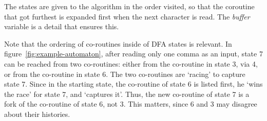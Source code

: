 \documentclass[11pt,a4paper,twoside,openright]{Thesis}
\theoremstyle{definition}
\newcommand{\Figref}[1]{figure~\ref{fig:#1}}
\begin{document}
The states are given to the algorithm in the order visited, so that the
coroutine that got furthest is expanded first when the next character is
read. The \emph{buffer} variable is a detail that ensures this.

Note that the ordering of co-routines inside of DFA states is relevant.
In \Figref{example-automaton}, after reading only one comma as an
input, state 7 can be reached from two co-routines: either from the
co-routine in state 3, via 4, or from the co-routine in state 6. The two
co-routines are `racing' to capture state 7. Since in the starting
state, the co-routine of state 6 is listed first, he `wins the race'
for state 7, and `captures it'. Thus, the new co-routine of state 7 is
a fork of the co-routine of state 6, not 3. This matters, since 6 and
3 may disagree about their histories.
\end{document}
